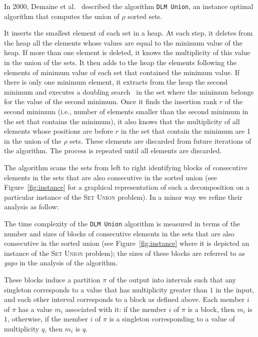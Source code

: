In 2000, Demaine et
al.~\cite{2000-SODA-AdaptiveSetIntersectionsUnionsAndDifferences-DemaineLopezOrtizMunro}
described the algorithm \texttt{DLM Union}, an instance optimal algorithm that
computes the union of $\rho$ sorted sets.
\begin{LONG}
  It inserts the smallest element of each set in a heap. At each step,
  it deletes from the heap all the elements whose values are equal to
  the minimum value of the heap. If more than one element is deleted,
  it knows the multiplicity of this value in the union of the sets. It
  then adds to the heap the elements following the elements of minimum
  value of each set that contained the minimum value. If there is only
  one minimum element, it extracts from the heap the second minimum
  and executes a doubling
  search~\cite{1976-IPL-AnAlmostOptimalAlgorithmForUnboundedSearching-BentleyYao}
  in the set where the minimum belongs for the value of the second
  minimum. Once it finds the insertion rank $r$ of the second minimum
  (i.e., number of elements smaller than the second minimum in the set
  that contains the minimum), it also knows that the multiplicity of
  all elements whose positions are before $r$ in the set that contain
  the minimum are 1 in the union of the $\rho$ sets. These
    elements are discarded from future iterations of the
    algorithm. The process is repeated until all elements
  are discarded.
\end{LONG}\begin{SHORT}The algorithm scans the sets from left to right identifying blocks of
  consecutive elements in the sets that are also consecutive in the
  sorted union (see Figure~\ref{fig:instance} for a graphical
  representation of such a decomposition on a particular
  instance of the \textsc{Set Union} problem). In a minor way we refine their analysis as follow:
  
\end{SHORT}
\begin{LONG}
  
The time complexity of the \texttt{DLM Union} algorithm is measured in terms of the number and sizes of blocks of consecutive elements in the sets that are also consecutive in the sorted union (see Figure~\ref{fig:instance} where it is depicted an instance of the \textsc{Set Union} problem); the sizes of these blocks are referred to as \emph{gaps} in the analysis of the algorithm.\end{LONG} These blocks induce a partition $\pi$ of the output into intervals such that any singleton corresponds to a value that has multiplicity greater than $1$ in the input, and each other interval corresponds to a block as defined above. Each member $i$ of $\pi$ has a value $m_i$ associated with it: if the member $i$ of $\pi$ is a block, then $m_i$ is $1$, otherwise, if the member $i$ of $\pi$ is a singleton corresponding to a value of multiplicity $q$, then $m_i$ is $q$.
